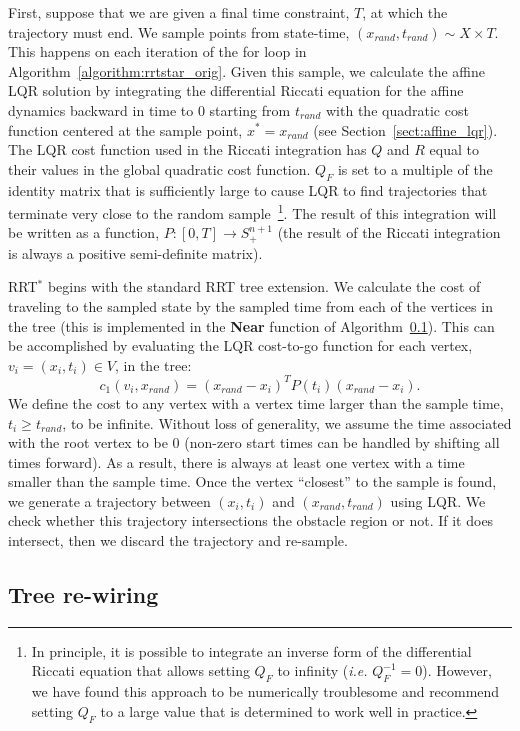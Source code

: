 \documentclass[letterpaper, 10pt, english, conference]{IEEEtran}
\begin{document}
First, suppose that we are given a final time constraint, $T$, at
which the trajectory must end. We sample points from state-time,
$(x_{rand}, t_{rand}) \sim X \times T$. This happens on each iteration
of the {\sc for} loop in Algorithm~\ref{algorithm:rrtstar_orig}. Given
this sample, we calculate the affine LQR solution by integrating the
differential Riccati equation for the affine dynamics backward in time
to $0$ starting from $t_{rand}$ with the quadratic cost function
centered at the sample point, $x^* = x_{rand}$ (see
Section~\ref{sect:affine_lqr}). The LQR cost function used in the
Riccati integration has $Q$ and $R$ equal to their values in the
global quadratic cost function. $Q_F$ is set to a multiple of the
identity matrix that is sufficiently large to cause LQR to find
trajectories that terminate very close to the random
sample~\footnote{In principle, it is possible to integrate an inverse
  form of the differential Riccati equation that allows setting $Q_F$
  to infinity ({\em i.e.} $Q_F^{-1} = 0$). However, we have found this
  approach to be numerically troublesome and recommend setting $Q_F$
  to a large value that is determined to work well in practice.}. The
result of this integration will be written as a function, $P: [0,T]
\to S^{n+1}_{+}$ (the result of the Riccati integration is always a
positive semi-definite matrix).

RRT$^*$ begins with the standard RRT tree extension. We calculate the
cost of traveling to the sampled state by the sampled time from each
of the vertices in the tree (this is implemented in the {\bf Near}
function of Algorithm~\ref{}). This can be accomplished by evaluating
the LQR cost-to-go function for each vertex, $v_i = (x_i, t_i) \in V$,
in the tree:
\[
c_1(v_i,x_{rand}) = (x_{rand} - x_i)^T P(t_i) (x_{rand} - x_i).
\]
We define the cost to any vertex with a vertex time larger than the
sample time, $t_i \geq t_{rand}$, to be infinite. Without loss of
generality, we assume the time associated with the root vertex to be
$0$ (non-zero start times can be handled by shifting all times
forward). As a result, there is always at least one vertex with a time
smaller than the sample time. Once the vertex ``closest'' to the
sample is found, we generate a trajectory between $(x_i, t_i)$ and
$(x_{rand}, t_{rand})$ using LQR. We check whether this trajectory
intersections the obstacle region or not. If it does intersect, then
we discard the trajectory and re-sample.


\subsection{Tree re-wiring}
\end{document}

